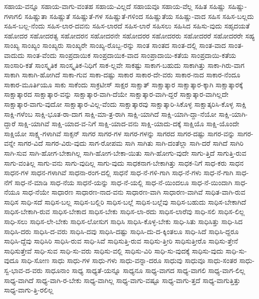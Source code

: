 {ಸಹಾಯ-ವನ್ನೂ
ಸಹಾಯ-ವಾಗು-ವಂತಹ
ಸಹಾಯ-ವಿಲ್ಲದೆ
ಸಹಾಯವೂ
ಸಹಾಯ-ವೆಲ್ಲ
ಸಹಿತ
ಸಹಿಷ್ಣು
ಸಹಿಷ್ಣು-ಗಳಾಗಲಿ
ಸಹಿಷ್ಣುತಾ
ಸಹಿಷ್ಣುತೆ
ಸಹಿಷ್ಣುತೆ-ಗಳ
ಸಹಿಷ್ಣುತೆ-ಗಳಿಂದ
ಸಹಿಷ್ಣುತೆಯ
ಸಹಿಷ್ಣು-ವಾದ
ಸಹಿಸ
ಸಹಿಸ-ಬಲ್ಲದು
ಸಹಿಸ-ಬಲ್ಲ-ನೆಂದು
ಸಹಿಸ-ಲಾರ-ದವನು
ಸಹಿಸ-ಲಾರದೆ
ಸಹಿಸ-ಲಾರೆ
ಸಹಿಸಲು
ಸಹಿಸಿದ
ಸಹಿಸು-ವುದು
ಸಹೃದಯತೆ
ಸಹೋದರ
ಸಹೋದರತ್ವ
ಸಹೋದರನ
ಸಹೋದರನೇ
ಸಹೋದರರ
ಸಹೋದರರು
ಸಹೋದರರೆ
ಸಹೋದರರೇ
ಸಹ್ಯ
ಸಾಂಖ್ಯ
ಸಾಂಖ್ಯಂ
ಸಾಂಖ್ಯರು
ಸಾಂಖ್ಯರೇ
ಸಾಂಖ್ಯ-ರೊಬ್ಬ-ರನ್ನು
ಸಾಂತ
ಸಾಂತದ
ಸಾಂತ-ದಲ್ಲಿ
ಸಾಂತ-ವಾದ
ಸಾಂತ-ವಾದುದು
ಸಾಂತ-ವೆಂದು
ಸಾಂಪ್ರದಾಯಿಕ
ಸಾಂಪ್ರದಾಯಿಕ-ವಾದ
ಸಾಂಪ್ರಾದಾಯಿ-ಕತೆಯ
ಸಾಂಪ್ರದಾಯಿ-ಕತೆಯ
ಸಾಂಸಾರಿ-ಕತೆ
ಸಾಂಸ್ಕೃತಿಕ
ಸಾಂಸ್ಕೃತಿಕ-ನಿಧಿಗೆ
ಸಾಕ-ಲ್ಲವೇ
ಸಾಕಷ್ಟು
ಸಾಕಾಗ-ಬಹುದು
ಸಾಕಾಗಿತ್ತು
ಸಾಕಾ-ಗಿರು-ವಾಗ
ಸಾಕಾಗಿ
ಸಾಕಾಗಿ-ಹೋಗಿದೆ
ಸಾಕಾ-ಗುವ
ಸಾಕಾ-ದಷ್ಟು
ಸಾಕಾರ
ಸಾಕಾರ-ದೇ-ವರು
ಸಾಕಾರ-ನಾದ
ಸಾಕಾರ-ನೆಂದೂ
ಸಾಕಾರ-ಮೂರ್ತಿಯೂ
ಸಾಕು
ಸಾಕೆಂದು
ಸಾಕ್ರಟೀಸ್
ಸಾಕ್ಷರ
ಸಾಕ್ಷಾತ್
ಸಾಕ್ಷಾತ್ಕಾರ
ಸಾಕ್ಷಾತ್ಕಾರ-ಕ್ಕಾಗಿ
ಸಾಕ್ಷಾತ್ಕಾರಕ್ಕೆ
ಸಾಕ್ಷಾತ್ಕಾರದ
ಸಾಕ್ಷಾತ್ಕಾರ-ವನ್ನು
ಸಾಕ್ಷಾತ್ಕಾರ-ವಾಗಿ-ದೆಯೇ
ಸಾಕ್ಷಾತ್ಕಾರ-ವಾಗಿ-ದ್ದರೆ
ಸಾಕ್ಷಾತ್ಕಾರ-ವಾಗಿಲ್ಲದೇ
ಸಾಕ್ಷಾತ್ಕಾರ-ವಾಗು-ವುದೋ
ಸಾಕ್ಷಾತ್ಕಾರ-ವಿಲ್ಲ-ವೆಂದು
ಸಾಕ್ಷಾತ್ಕಾರವು
ಸಾಕ್ಷಾತ್ಕಾರಿ-ಸಿಕೊಳ್ಳ
ಸಾಕ್ಷಾತ್ಕರಿಸಿ-ಕೊಳ್ಳ
ಸಾಕ್ಷಿ
ಸಾಕ್ಷಿ-ಗಳೆಂಬ
ಸಾಕ್ಷಿ-ಭೂತ-ರಾ-ದಾಗ
ಸಾಕ್ಷಿ-ಮಾ-ತ್ರ-ರಾಗಿ
ಸಾಕ್ಷಿ-ಯಾಗಿದೆ
ಸಾಕ್ಷಿ-ಯಾಗಿ-ದ್ದಾ-ನೆಯೋ
ಸಾಕ್ಷಿ-ಯಾಗಿ-ದ್ದಾರೆ
ಸಾಕ್ಷಿ-ಯಾಗಿವೆ
ಸಾಕ್ಷಿ-ಯಾದ-ವ-ನಿಗೆ
ಸಾಕ್ಷಿ-ಯಾದ-ವನು
ಸಾಕ್ಷಿ-ಯಾದು-ದಕ್ಕೆ
ಸಾಕ್ಷಿಯೊ
ಸಾಕ್ಷಿ-ಯೊಂದೇ
ಸಾಕ್ಷಿಯೋ
ಸಾಕ್ಷ್ಯ-ಗಳಾಗಿವೆ
ಸಾಕ್ಸನ್
ಸಾಗರ
ಸಾಗರ-ಗಳ
ಸಾಗರ-ಗಳನ್ನು
ಸಾಗರದ
ಸಾಗರ-ದಷ್ಟು
ಸಾಗರ-ವನ್ನು
ಸಾಗರ-ವನ್ನೇ
ಸಾಗರ-ವಿದೆ
ಸಾಗರ-ವಿರು-ವುದು
ಸಾಗ-ರೋಪಮ
ಸಾಗಿ
ಸಾಗಿತು
ಸಾಗಿ-ದಂತೆಲ್ಲಾ
ಸಾಗಿ-ದರೆ
ಸಾಗಿದೆ
ಸಾಗಿರಿ
ಸಾಗಿ-ಸುವ
ಸಾಗಿ-ಹೋಗ-ಬೇಕಾಗಿಲ್ಲ
ಸಾಗಿ-ಹೋಗ-ಬೇಕಾ-ಯಿತು
ಸಾಗಿ-ಹೋಗು-ವುದೇ
ಸಾಗು-ತ್ತಿದೆ
ಸಾಗುತ್ತಿ-ರುವ
ಸಾಗು-ವಂತಿಲ್ಲ
ಸಾಗು-ವನು
ಸಾಗು-ವುದಿಲ್ಲ
ಸಾಗು-ವುದು
ಸಾಧಕನಾಗ-ಬೇಕಾಗಿತ್ತು
ಸಾಧಕ-ನಿಗೆ
ಸಾಧ-ಕರು
ಸಾಧನ
ಸಾಧನ-ಗಳ
ಸಾಧನ-ಗಳಾಗಿವೆ
ಸಾಧನಾ-ರಂಗ-ದಲ್ಲಿ
ಸಾಧನೆ
ಸಾಧ-ನೆ-ಗಳಿ-ಗಾಗಿ
ಸಾಧ-ನೆ-ಗಳು
ಸಾಧ-ನೆ-ಗಾಗಿ
ಸಾಧ-ನೆಗೆ
ಸಾಧ-ನೆ-ಮಾಡಿ
ಸಾಧ-ನೆಯ
ಸಾಧನೆ-ಯನ್ನು
ಸಾಧ-ನೆ-ಯಲ್ಲಿ
ಸಾಧ-ನೆ-ಯಿಂದಲೂ
ಸಾಧ-ನೆ-ಯಿಂದಾಗಿ
ಸಾಧ-ನೆಯೂ
ಸಾಧ-ನೆಯೇ
ಸಾಧಾರಣ
ಸಾಧಾರಣ-ನಾದ-ವನು
ಸಾಧಾರಣ-ವಾಗಿ
ಸಾಧಾರಣ-ವಾಗಿವೆ
ಸಾಧಿತ-ವಾಗಿ-ರುವ
ಸಾಧಿಸ
ಸಾಧಿ-ಸದೆ
ಸಾಧಿಸ-ಬಲ್ಲ
ಸಾಧಿಸ-ಬಲ್ಲಿರಿ
ಸಾಧಿಸ-ಬಲ್ಲೆ
ಸಾಧಿಸ-ಬಲ್ಲೆವು
ಸಾಧಿಸ-ಬಹುದು
ಸಾಧಿಸ-ಬೇಕಾಗಿದೆ
ಸಾಧಿಸ-ಬೇಕಾಗಿ-ರುವ
ಸಾಧಿಸ-ಬೇಕಾದ
ಸಾಧಿಸ-ಬೇಕು
ಸಾಧಿಸ-ಲಾ-ರದು
ಸಾಧಿಸ-ಲಾರೆವು
ಸಾಧಿ-ಸಲಿ
ಸಾಧಿಸ-ಲಿಲ್ಲ
ಸಾಧಿ-ಸಲು
ಸಾಧಿಸ-ಲೇ-ಬೇಕು
ಸಾಧಿಸ-ಲೋಸುಗ
ಸಾಧಿಸಿ
ಸಾಧಿಸಿ-ಕೊಳ್ಳ-ಬೇಕು
ಸಾಧಿ-ಸಿತು
ಸಾಧಿಸಿತ್ತು
ಸಾಧಿ-ಸಿದ
ಸಾಧಿಸಿ-ದರು
ಸಾಧಿಸಿ-ದ-ವರು
ಸಾಧಿಸಿ-ದವು
ಸಾಧಿಸಿ-ದಷ್ಟು
ಸಾಧಿಸಿ-ದು-ದ-ಕ್ಕಿಂತಲೂ
ಸಾಧಿ-ಸಿದೆ
ಸಾಧಿಸಿ-ದ್ದರೂ
ಸಾಧಿಸಿ-ದ್ದೆವು
ಸಾಧಿಸಿರಿ
ಸಾಧಿಸಿ-ರುವ
ಸಾಧಿ-ಸಿವೆ
ಸಾಧಿಸುತ್ತಿ-ರುವ
ಸಾಧಿಸು-ತ್ತೀರಿ
ಸಾಧಿಸುತ್ತೀರೊ
ಸಾಧಿಸು-ತ್ತೇನೆ
ಸಾಧಿಸುತ್ತೇವೆ
ಸಾಧಿ-ಸುವ
ಸಾಧಿ-ಸು-ವರು
ಸಾಧಿಸು-ವಲ್ಲಿ
ಸಾಧಿಸು-ವಿರಿ
ಸಾಧಿ-ಸು-ವುದಕ್ಕೆ
ಸಾಧಿಸು-ವುದು
ಸಾಧಿ-ಸು-ವುದೂ
ಸಾಧಿ-ಸೋಣ
ಸಾಧು
ಸಾಧು-ಗಳ
ಸಾಧು-ಗಳು
ಸಾಧು-ವನ್ನಾ-ದರೂ
ಸಾಧುವು
ಸಾಧುವೂ
ಸಾಧು-ಸಂತರ
ಸಾಧು-ಸ್ವ-ಭಾವ-ದ-ವರು
ಸಾಧೂನಾಂ
ಸಾಧ್ಯ
ಸಾಧ್ಯತೆ-ಯನ್ನೂ
ಸಾಧ್ಯನೂ
ಸಾಧ್ಯ-ವಾಗದ
ಸಾಧ್ಯ-ವಾಗಲಿ
ಸಾಧ್ಯ-ವಾಗ-ಲಿಲ್ಲ
ಸಾಧ್ಯ-ವಾಗಿದೆ
ಸಾಧ್ಯ-ವಾಗಿ-ರ-ಬೇಕು
ಸಾಧ್ಯ-ವಾಗಿಲ್ಲ
ಸಾಧ್ಯ-ವಾಗು-ವಷ್ಟೂ
ಸಾಧ್ಯ-ವಾಗು-ತ್ತದೆ
ಸಾಧ್ಯ-ವಾಗುತ್ತಿತ್ತು
ಸಾಧ್ಯ-ವಾಗು-ತ್ತಿ-ರಲಿಲ್ಲ
}
